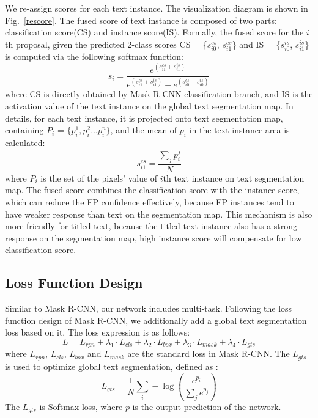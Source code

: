 \documentclass[letterpaper]{article} \usepackage{aaai19}  \usepackage{times}  \usepackage{helvet}  \usepackage{courier}  \usepackage{url}  \usepackage{graphicx}
\begin{document}
We re-assign scores for each text instance. The visualization diagram is shown in Fig.~\ref{rescore}. The fused score of text instance is composed of two parts: classification score(CS) and instance score(IS).
Formally, the fused score for the $i$th proposal, given the predicted 2-class scores CS = \{$s_{i0}^{cs}$, $s_{i1}^{cs}$\} and IS = \{$s_{i0}^{is}$, $s_{i1}^{is}$\} is computed via the following softmax function:
\begin{equation}
\label{gongshi7}
s_{i} = \frac{e^{(s_{i1}^{cs}+s_{i1}^{is})}}   {e^{(s_{i1}^{cs}+s_{i1}^{is})} +e^{(s_{i0}^{cs}+s_{i0}^{is})}}
\end{equation}
where CS is directly obtained by Mask R-CNN classification branch, and IS is the activation value of the text instance on the global text segmentation map.
In details, for each text instance, it is projected onto text segmentation map, containing $P_i$ = $\{p_i^1,p_i^2...p_i^n\}$, and the mean of $p_i$ in the text instance area is calculated:
\begin{equation}
\label{gongshi8}
s_{i1}^{cs} = \frac{\sum_{j} p_i^j }{N} 
\end{equation}
where $P_i$ is the set of the pixels' value of $i$th text instance on text segmentation map.
The fused score combines the classification score with the instance score,
which can reduce the FP confidence effectively, because FP instances tend to have weaker response than text on the segmentation map.
This mechanism is also more friendly for titled text, because the titled text instance also has a strong response on the segmentation map, high instance score will compensate for low classification score.


 \subsection{Loss Function Design}
 Similar to Mask R-CNN, our network includes multi-task. 
 Following the loss function design of Mask R-CNN, we additionally add a global text segmentation loss based on it.
 The loss expression is as follows:
 \begin{equation}
\label{gongshi9}
L = L_{rpn} + \lambda_1 \cdot L_{cls} +  \lambda_2 \cdot L_{box} + \lambda_3 \cdot L_{mask} + \lambda_4 \cdot L_{gts}
\end{equation}
where  $L_{rpn}$,  $L_{cls}$,  $L_{box}$ and $L_{mask} $ are the standard loss in Mask R-CNN. 
The $L_{gts}$  is used to optimize global text segmentation, defined as :
\begin{equation}
\label{gongshi10}
L_{gts} = \frac{1}{N}  \sum_{i} {-}\log(\frac{e^{p_i}}{\sum_j {e^{p_j}}})
\end{equation}
The $L_{gts}$ is Softmax loss, where $p$ is the output prediction of the network.
\end{document}
